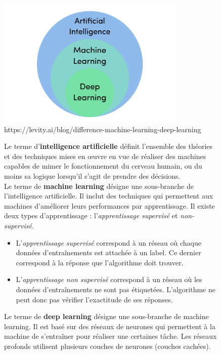 \documentclass{article}
\begin{document}
\begin{figure}[H]
\begin{minipage}[c]{0.4\linewidth}

\centering
\includegraphics[width=0.8\textwidth]{img/diagram1.png}
https://levity.ai/blog/difference-machine-learning-deep-learning

\end{minipage} \hfill
\begin{minipage}[c]{0.6\linewidth}


Le terme d'\textbf{intelligence artificielle} définit l'ensemble des théories et des techniques 
mises en œuvre en vue de réaliser des machines capables de mimer le fonctionnement du cerveau humain, 
ou du moins sa logique lorsqu’il s’agit de prendre des décisions. \\

Le terme de \textbf{machine learning} désigne une sous-branche de l'intelligence artificielle.
Il inclut des techniques qui permettent aux machines d'améliorer leurs performances par apprentissage.
Il existe deux types d'apprentissage : l'\textit{apprentissage supervisé} et \textit{non-supervisé}.
\begin{itemize}
\item L'\textit{apprentissage supervisé} correspond à un réseau où chaque données d'entraînements est attachée à un label. 
Ce dernier correspond à la réponse que l'algorithme doit trouver. 
\item L'\textit{apprentissage non supervisé} correspond à un réseau où les données d'entraînements ne sont pas étiquetées.
L'algorithme ne peut donc pas vérifier l'exactitude de ses réponses.

\end{itemize}

Le terme de \textbf{deep learning} désigne une sous-branche de machine learning. 
Il est basé sur des réseaux de neurones qui permettent à la machine de 
s'entraîner pour réaliser une certaines tâche. Les réseaux profonds utilisent 
plusieurs couches de neurones (couches cachées). 

\end{minipage}
\end{figure}
\end{document}

